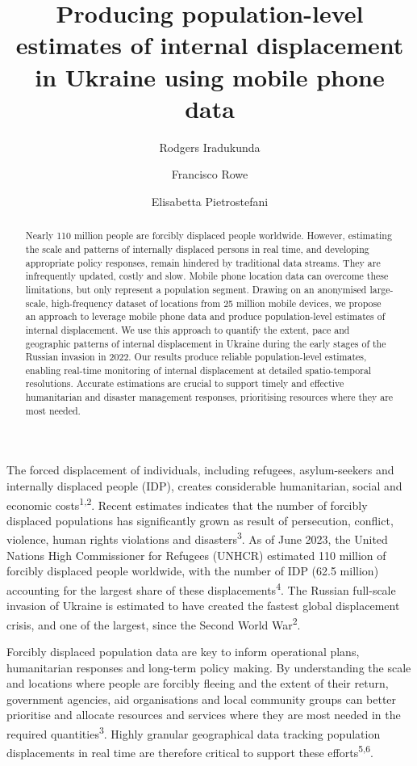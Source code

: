 \documentclass[
  11pt,
]{article}
\title{\textbf{Producing population-level estimates of internal
displacement in Ukraine using mobile phone data}}
\author[1]{Rodgers Iradukunda}
\author[1]{Francisco Rowe}
\author[1]{Elisabetta Pietrostefani}
\affil[1]{Geographic Data Science Lab, Department of Geography and
Planning, University of Liverpool, Liverpool, United Kingdom}
\date{}
\begin{document}
\maketitle
\begin{abstract}
Nearly 110 million people are forcibly displaced people worldwide.
However, estimating the scale and patterns of internally displaced
persons in real time, and developing appropriate policy responses,
remain hindered by traditional data streams. They are infrequently
updated, costly and slow. Mobile phone location data can overcome these
limitations, but only represent a population segment. Drawing on an
anonymised large-scale, high-frequency dataset of locations from 25
million mobile devices, we propose an approach to leverage mobile phone
data and produce population-level estimates of internal displacement. We
use this approach to quantify the extent, pace and geographic patterns
of internal displacement in Ukraine during the early stages of the
Russian invasion in 2022. Our results produce reliable population-level
estimates, enabling real-time monitoring of internal displacement at
detailed spatio-temporal resolutions. Accurate estimations are crucial
to support timely and effective humanitarian and disaster management
responses, prioritising resources where they are most needed.
\end{abstract}


\newpage

The forced displacement of individuals, including refugees,
asylum-seekers and internally displaced people (IDP), creates
considerable humanitarian, social and economic
costs\textsuperscript{1,2}. Recent estimates indicates that the number
of forcibly displaced populations has significantly grown as result of
persecution, conflict, violence, human rights violations and
disasters\textsuperscript{3}. As of June 2023, the United Nations High
Commissioner for Refugees (UNHCR) estimated 110 million of forcibly
displaced people worldwide, with the number of IDP (62.5 million)
accounting for the largest share of these
displacements\textsuperscript{4}. The Russian full-scale invasion of
Ukraine is estimated to have created the fastest global displacement
crisis, and one of the largest, since the Second World
War\textsuperscript{2}.

Forcibly displaced population data are key to inform operational plans,
humanitarian responses and long-term policy making. By understanding the
scale and locations where people are forcibly fleeing and the extent of
their return, government agencies, aid organisations and local community
groups can better prioritise and allocate resources and services where
they are most needed in the required quantities\textsuperscript{3}.
Highly granular geographical data tracking population displacements in
real time are therefore critical to support these
efforts\textsuperscript{5,6}.
\end{document}
